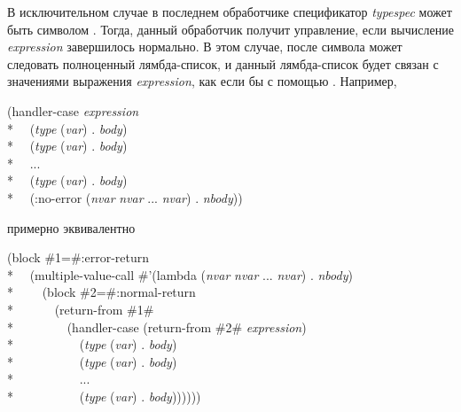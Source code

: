 \begin{defmac}
В исключительном случае в последнем обработчике спецификатор \emph{typespec} может быть символом
. Тогда, данный обработчик получит управление, если
вычисление \emph{expression} завершилось нормально. В этом случае, после символа
 может следовать полноценный лямбда-список, и данный лямбда-список
будет связан с значениями выражения \emph{expression}, как если бы с помощью
. Например,
\begin{lisp}
(handler-case \emph{expression} \\*
~~(\emph{type} (\emph{var}) . \emph{body}) \\*
~~(\emph{type} (\emph{var}) . \emph{body}) \\*
~~... \\*
~~(\emph{type} (\emph{var}) . \emph{body}) \\*
~~(:no-error (\emph{nvar} \emph{nvar} ... \emph{nvar}) . \emph{nbody}))
\end{lisp}
примерно эквивалентно
\begin{lisp}
(block \#1=\#:error-return \\*
~~(multiple-value-call \#'(lambda (\emph{nvar} \emph{nvar} ... \emph{nvar}) . \emph{nbody}) \\*
~~~~(block \#2=\#:normal-return \\*
~~~~~~(return-from \#1\# \\*
~~~~~~~~(handler-case (return-from \#2\# \emph{expression}) \\*
~~~~~~~~~~(\emph{type} (\emph{var}) . \emph{body}) \\*
~~~~~~~~~~(\emph{type} (\emph{var}) . \emph{body}) \\*
~~~~~~~~~~... \\*
~~~~~~~~~~(\emph{type} (\emph{var}) . \emph{body}))))))
\end{lisp}


\end{defmac}
